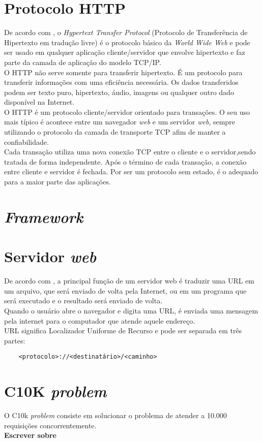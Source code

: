 \section{Protocolo HTTP}
De acordo com , o \textit{Hypertext Transfer 
Protocol} (Protocolo de Transferência de Hipertexto em tradução livre) é o 
protocolo básico da \textit{World Wide Web} e pode ser usado em qualquer 
aplicação cliente/servidor que envolve hipertexto e faz parte da camada de 
aplicação do modelo TCP/IP.\\
O HTTP não serve somente para transferir hipertexto. É um protocolo para transferir informações com uma eficiência necessária. Os dados transferidos podem ser texto puro, hipertexto, áudio, imagens ou qualquer outro dado disponível na Internet.\\
O HTTP é um protocolo cliente/servidor orientado para transações. O seu uso 
mais típico é acontece entre um navegador \textit{web} e um servidor 
\textit{web}, sempre utilizando o protocolo da camada de transporte TCP afim de 
manter a confiabilidade.\\
Cada transação utiliza uma nova conexão TCP entre o cliente e o servidor,sendo 
tratada de forma independente. Após o término de cada transação, a conexão 
entre cliente e servidor é fechada. Por ser um protocolo sem estado, é o 
adequado para a maior parte das aplicações.\\
\section{\textit{Framework}}

\section{Servidor \textit{web}}
De acordo com , a principal função de um 
servidor web é traduzir uma URL em um arquivo, que será enviado de volta pela 
Internet, ou em um programa que será executado e o resultado será enviado de 
volta.\\
Quando o usuário abre o navegador e digita uma URL, é enviada uma 
mensagem pela internet para o computador que atende aquele endereço.\\
URL significa Localizador Uniforme de Recurso e pode ser separada em três 
partes:
\begin{verbatim}
	<protocolo>://<destinatário>/<caminho>
\end{verbatim}
\section{C10K \textit{problem}}
O C10k \textit{problem} consiste em solucionar o problema de atender a 10.000 requisições concorrentemente.\\
\textbf{Escrever sobre}